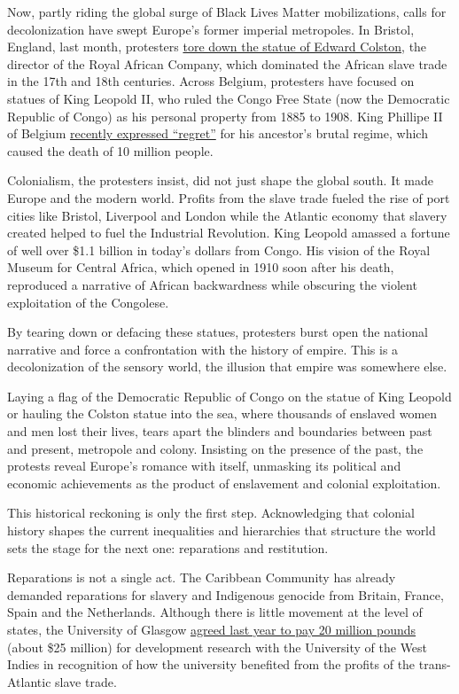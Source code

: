 Now, partly riding the global surge of Black Lives Matter mobilizations,
calls for decolonization have swept Europe's former imperial metropoles.
In Bristol, England, last month, protesters
\href{https://www.nytimes.com/2020/06/12/opinion/edward-colston-statue-racism.html}{tore
down the statue of Edward Colston}, the director of the Royal African
Company, which dominated the African slave trade in the 17th and 18th
centuries. Across Belgium, protesters have focused on statues of King
Leopold II, who ruled the Congo Free State (now the Democratic Republic
of Congo) as his personal property from 1885 to 1908. King Phillipe II
of Belgium
\href{https://www.nytimes.com/2020/06/30/world/europe/belgium-king-congo.html}{recently
expressed ``regret''} for his ancestor's brutal regime, which caused the
death of 10 million people.

Colonialism, the protesters insist, did not just shape the global south.
It made Europe and the modern world. Profits from the slave trade fueled
the rise of port cities like Bristol, Liverpool and London while the
Atlantic economy that slavery created helped to fuel the Industrial
Revolution. King Leopold amassed a fortune of well over \$1.1 billion in
today's dollars from Congo. His vision of the Royal Museum for Central
Africa, which opened in 1910 soon after his death, reproduced a
narrative of African backwardness while obscuring the violent
exploitation of the Congolese.

By tearing down or defacing these statues, protesters burst open the
national narrative and force a confrontation with the history of empire.
This is a decolonization of the sensory world, the illusion that empire
was somewhere else.

Laying a flag of the Democratic Republic of Congo on the statue of King
Leopold or hauling the Colston statue into the sea, where thousands of
enslaved women and men lost their lives, tears apart the blinders and
boundaries between past and present, metropole and colony. Insisting on
the presence of the past, the protests reveal Europe's romance with
itself, unmasking its political and economic achievements as the product
of enslavement and colonial exploitation.

This historical reckoning is only the first step. Acknowledging that
colonial history shapes the current inequalities and hierarchies that
structure the world sets the stage for the next one: reparations and
restitution.

Reparations is not a single act. The Caribbean Community has already
demanded reparations for slavery and Indigenous genocide from Britain,
France, Spain and the Netherlands. Although there is little movement at
the level of states, the University of Glasgow
\href{https://www.theguardian.com/uk-news/2019/aug/23/glasgow-university-slave-trade-reparations}{agreed
last year to pay 20 million pounds} (about \$25 million) for development
research with the University of the West Indies in recognition of how
the university benefited from the profits of the trans-Atlantic slave
trade.

